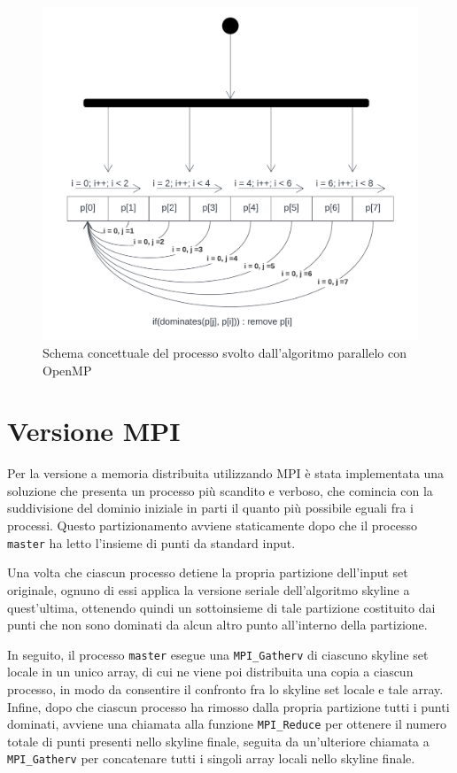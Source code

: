 \documentclass[letterpaper,11pt,leqno]{article}
\begin{document}
\begin{figure}[h]
  \centering
    \includegraphics[scale=0.4]{OMP.pdf}
    \caption{Schema concettuale del processo svolto dall'algoritmo parallelo con OpenMP}
    \label{f:graph1}
\end{figure}







\section{Versione MPI}\label{s:section}


Per la versione a memoria distribuita utilizzando MPI è stata implementata una soluzione che presenta un processo più scandito e verboso, che comincia con la suddivisione del dominio iniziale in parti il quanto più possibile eguali fra i processi. Questo partizionamento avviene staticamente dopo che il processo \texttt{master} ha letto l'insieme di punti da standard input.

Una volta che ciascun processo detiene la propria partizione dell'input set originale, ognuno di essi applica la versione seriale dell'algoritmo skyline a quest'ultima, ottenendo quindi un sottoinsieme di tale partizione costituito dai punti che non sono dominati da alcun altro punto all'interno della partizione.

In seguito, il processo \texttt{master} esegue una \texttt{MPI\_Gatherv} di ciascuno skyline set locale in un unico array, di cui ne viene poi distribuita una copia a ciascun processo, in modo da consentire il confronto fra lo skyline set locale e tale array. Infine, dopo che ciascun processo ha rimosso dalla propria partizione tutti i punti dominati, avviene una chiamata alla funzione \texttt{MPI\_Reduce} per ottenere il numero totale di punti presenti nello skyline finale, seguita da un'ulteriore chiamata a \texttt{MPI\_Gatherv} per concatenare tutti i singoli array locali nello skyline finale.
\end{document}
